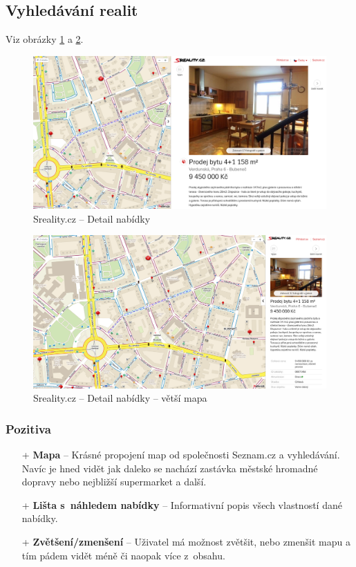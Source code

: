 
\newpage
\subsection{Vyhledávání realit}
Viz obrázky \ref{fig:sreality:detail} a \ref{fig:sreality:detail-big-map}.
\begin{figure}[h]
    \centering
    \includegraphics[width=1.0\textwidth]{media/sreality/detail.png}
    \caption{Sreality.cz -- Detail nabídky}
    \label{fig:sreality:detail}
\end{figure}
\begin{figure}[h]
    \centering
    \includegraphics[width=1.0\textwidth]{media/sreality/detail-big-map.png}
    \caption{Sreality.cz -- Detail nabídky -- větší mapa}
    \label{fig:sreality:detail-big-map}
\end{figure}
\subsubsection*{Pozitiva}
\begin{itemize}
    \item[+] \textbf{Mapa} -- Krásné propojení map od společnosti Seznam.cz a vyhledávání. Navíc je hned vidět jak daleko se nachází zastávka městské hromadné dopravy nebo nejbližší supermarket a další.
    \item[+] \textbf{Lišta s~náhledem nabídky} -- Informativní popis všech vlastností dané nabídky.
    \item[+] \textbf{Zvětšení/zmenšení} -- Uživatel má možnost zvětšit, nebo zmenšit mapu a tím pádem vidět méně či naopak více z~obsahu.
\end{itemize}
